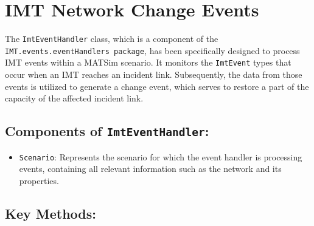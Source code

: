 \documentclass[fancy, oneside, mastersfancy, ms]{byuthesis}
\providecommand{\tightlist}{%
  \setlength{\itemsep}{0pt}\setlength{\parskip}{0pt}}\usepackage{longtable,booktabs,array}
\begin{document}
\hypertarget{imt-network-change-events}{%
\chapter{IMT Network Change Events}\label{imt-network-change-events}}

The \texttt{ImtEventHandler} class, which is a component of the
\texttt{IMT.events.eventHandlers\ package}, has been specifically
designed to process IMT events within a MATSim scenario. It monitors the
\texttt{ImtEvent} types that occur when an IMT reaches an incident link.
Subsequently, the data from those events is utilized to generate a
change event, which serves to restore a part of the capacity of the
affected incident link.

\hypertarget{components-of-imteventhandler}{%
\section{\texorpdfstring{Components of
\texttt{ImtEventHandler}:}{Components of ImtEventHandler:}}\label{components-of-imteventhandler}}

\begin{itemize}
\tightlist
\item
  \texttt{Scenario}: Represents the scenario for which the event handler
  is processing events, containing all relevant information such as the
  network and its properties.
\end{itemize}

\hypertarget{key-methods-1}{%
\section{Key Methods:}\label{key-methods-1}}
\end{document}
